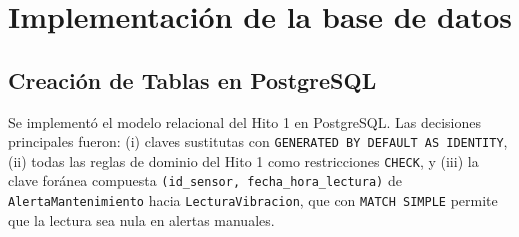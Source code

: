 \documentclass[11pt,a4paper]{article}
\begin{document}
\newpage
\section{Implementación de la base de datos}

\subsection{Creación de Tablas en PostgreSQL}

Se implementó el modelo relacional del Hito 1 en PostgreSQL. Las decisiones
principales fueron: (i) claves sustitutas con
\texttt{GENERATED BY DEFAULT AS IDENTITY}, (ii) todas las reglas de dominio del
Hito 1 como restricciones \texttt{CHECK}, y (iii) la clave foránea compuesta
\texttt{(id\_sensor, fecha\_hora\_lectura)} de \texttt{AlertaMantenimiento}
hacia \texttt{LecturaVibracion}, que con \texttt{MATCH SIMPLE} permite que la
lectura sea nula en alertas manuales.
\end{document}
